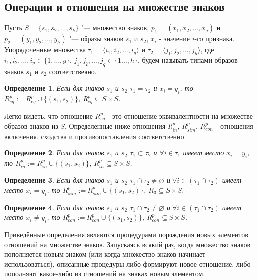 \documentclass[12pt]{scrartcl}
\newtheorem{definition}{Определение}
\begin{document}
	\subsection{Операции и отношения на множестве знаков}
	Пусть $S=\{s_1,s_2,\dots,s_k\}$ "--- множество знаков, $p_1=(x_1,x_2,\dots,x_g)$ и $p_2=(y_1,y_2,\dots,y_h)$ "--- образы знаков $s_1$ и $s_2$, $x_i$ - значение $i$-го признака. Упорядоченные множества $\tau_1=\langle i_1,i_2,\dots,i_g\rangle$ и $\tau_2=\langle j_1,j_2,\dots,j_h\rangle$, где $i_1,i_2,\dots,i_p\in\{1,\dots,g\}$, $j_1,j_2,\dots,j_q\in\{1\dots,h\}$, будем называть типами образов знаков $s_1$ и $s_2$ соответственно.
		
	\begin{definition}
		Если для знаков $s_1$ и $s_2$ $\tau_1=\tau_2$ и $x_i=y_i$, то $R^p_{eq}:=R^p_{eq}\cup\{(s_1,s_2)\}$, $R^p_{eq}\subseteq S\times S$.
	\end{definition}

	Легко видеть, что отношение $R^p_{eq}$ - это отношение эквивалентности на множестве образов знаков из $S$. Определенные ниже отношения $R^p_{in}$, $R^p_{sim}$, $R^p_{con}$ - отношения включения, сходства и противопоставления соответственно.

	\begin{definition}
		 Если для знаков $s_1$ и $s_2$ $\tau_1\subset\tau_2$ и $\forall i\in\tau_1$ имеет место $x_i=y_i$, то $R^p_{in}:=R^p_{in}\cup\{(s_1,s_2)\}$, $R^p_{in}\subseteq S\times S$.
	\end{definition}
	
	\begin{definition}
		Если для знаков $s_1$ и $s_2$ $\tau_1\cap\tau_2\not =\varnothing$ и $\forall i\in(\tau_1\cap\tau_2)$ имеет место $x_i=y_i$, то $R^p_{sim}:=R^p_{sim}\cup\{(s_1,s_2)\}$, $R_3\subseteq S\times S$.
	\end{definition}
	
	\begin{definition}
		Если для знаков $s_1$ и $s_2$ $\tau_1\cap\tau_2\not =\varnothing$ и $\forall i\in(\tau_1\cap\tau_2)$ имеет место $x_i\not =y_i$, то $R^p_{con}:=R^p_{con}\cup\{(s_1,s_2)\}$, $R^p_{con}\subseteq S\times S$.
	\end{definition}

	Приведённые определения являются процедурами порождения новых элементов отношений на множестве знаков. Запускаясь всякий раз, когда множество знаков пополняется новым знаком (или когда множество знаков начинает использоваться), описанные процедуры либо формируют новое отношение, либо пополняют какое-либо из отношений на знаках новым элементом.
	
\end{document}
